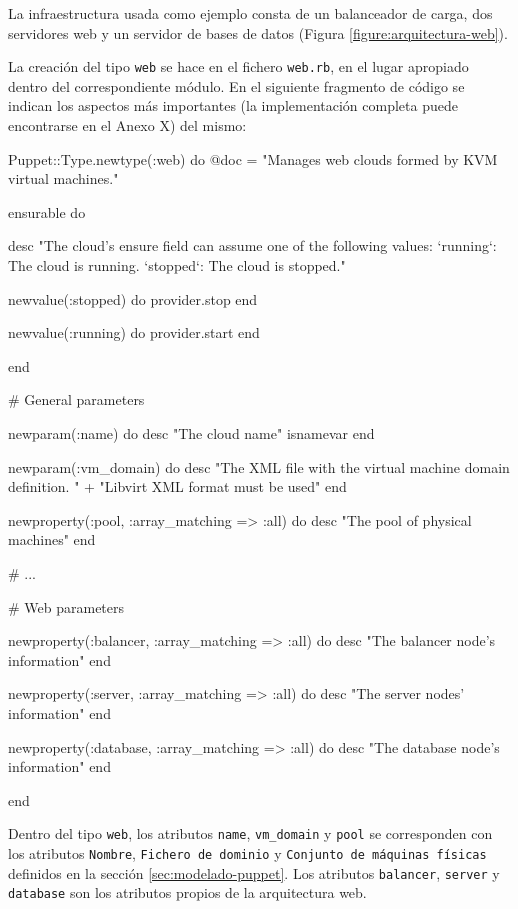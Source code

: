 La infraestructura usada como ejemplo consta de un balanceador de carga, dos servidores web y un servidor de bases de datos (Figura \ref{figure:arquitectura-web}).


\pagebreak

La creación del tipo \texttt{web} se hace en el fichero \texttt{web.rb}, en el lugar apropiado dentro del correspondiente módulo. En el siguiente fragmento de código se indican los aspectos más importantes (la implementación completa puede encontrarse en el Anexo X) del mismo:

\begin{rubycode}
Puppet::Type.newtype(:web) do
   @doc = "Manages web clouds formed by KVM virtual machines."
   
   
   ensurable do

      desc "The cloud's ensure field can assume one of the following values:
   `running`: The cloud is running.
   `stopped`: The cloud is stopped.\n"
   
      newvalue(:stopped) do
         provider.stop
      end

      newvalue(:running) do
         provider.start
      end

   end


   # General parameters
   
   newparam(:name) do
      desc "The cloud name"
      isnamevar
   end
   
   newparam(:vm_domain) do
      desc "The XML file with the virtual machine domain definition. " +
           "Libvirt XML format must be used"
   end
   
   newproperty(:pool, :array_matching => :all) do
      desc "The pool of physical machines"
   end

   # ...


   # Web parameters
   
   newproperty(:balancer, :array_matching => :all) do
      desc "The balancer node's information"
   end
   
   newproperty(:server, :array_matching => :all) do
      desc "The server nodes' information"
   end
   
   newproperty(:database, :array_matching => :all) do
      desc "The database node's information"
   end

end

\end{rubycode}

Dentro del tipo \texttt{web}, los atributos \texttt{name}, \texttt{vm\_domain} y \texttt{pool} se corresponden con los atributos \texttt{Nombre}, \texttt{Fichero de dominio} y \texttt{Conjunto de máquinas físicas} definidos en la sección \ref{sec:modelado-puppet}. Los atributos \texttt{balancer}, \texttt{server} y \texttt{database} son los atributos propios de la arquitectura web.

